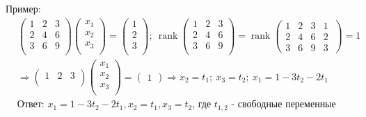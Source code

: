 \documentclass[12pt]{article}
\DeclareMathOperator{\rank}{rank}
\begin{document}
\begin{sloppypar}
    Пример:
    \begin{align*}
         & \begin{pmatrix}
               1 & 2 & 3 \\
               2 & 4 & 6 \\
               3 & 6 & 9 \\
           \end{pmatrix}
        \begin{pmatrix}
            x_1 \\ x_2 \\ x_3 \\
        \end{pmatrix}
        =
        \begin{pmatrix}
            1 \\ 2 \\ 3 \\
        \end{pmatrix};\
        \rank \begin{pmatrix}
                  1 & 2 & 3 \\
                  2 & 4 & 6 \\
                  3 & 6 & 9 \\
              \end{pmatrix}
        =
        \rank \begin{pmatrix}
                  1 & 2 & 3 & 1   \\
                  2 & 4 & 6 & 2   \\
                  3 & 6 & 9 & 3 \
              \end{pmatrix}
        = 1
        \\
         & \Rightarrow
        \begin{pmatrix}
            1 & 2 & 3 \\
        \end{pmatrix}
        \begin{pmatrix}
            x_1 \\ x_2 \\ x_3 \\
        \end{pmatrix}
        =
        \begin{pmatrix}
            1
        \end{pmatrix}
        \Rightarrow x_2 = t_1;\ x_3 = t_2;\ x_1 = 1 - 3t_2 - 2t_1                                                   \\
         & \text{Ответ: } x_1 = 1 - 3t_2 - 2t_1, x_2 = t_1, x_3 = t_2 \text{, где $t_{1,2}$ - свободные переменные}
    \end{align*}


\end{sloppypar}
\end{document}
